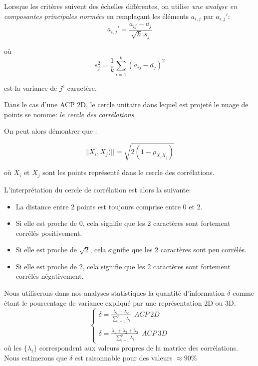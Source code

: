 \documentclass[a4paper]{article}
\begin{document}
Lorsque les critères suivent des échelles différentes, on utilise \textit{une analyse en composantes principales normées}  en remplaçant les éléments $a_{i,j}$ par $a_{i,j}'$:
$$a_{i,j}'=\frac{a_{ij}-\overline{a_{j}}}{\sqrt{k} .s_{j}}$$

où
$$s_{j}^{2}=\frac{1}{k}\sum_{i=1}^{k}(a_{ij}-\overline{a_{j}})^{2}$$

est la variance de $j^{e}$ caractère. 


Dans le cas d'une ACP 2D, le cercle unitaire dans lequel est projeté le nuage de points se nomme: \textit{le cercle des corrélations}.

On peut alors démontrer que :

$$||X_{i},X_{j})||=\sqrt{2(1-\rho_{X_{i}X_{j}})}$$

où $X_{i}$ et $X_{j}$ sont les points représenté dans le cercle des corrélations.



L'interprétation du cercle de corrélation est alors la suivante:

\begin{itemize}
  \item La distance entre 2 points est toujours comprise entre 0 et 2.
  \item Si elle est proche de 0, cela signifie que les 2 caractères sont fortement corrélés positivement.
   \item Si elle est proche de $\sqrt{2}$, cela signifie que les 2 caractères sont peu corrélés.
   \item Si elle est proche de 2, cela signifie que les 2 caractères sont fortement corrélés négativement.

\end{itemize}

Nous utiliserons dans nos analyses statistiques la quantité d'information $\delta$ comme étant le pourcentage de variance expliqué par une représentation 2D ou 3D.
\[
\left\lbrace 
\begin{array}{lcl}
\delta=\frac{\lambda_{1}+\lambda_{2}}{\sum_{i=1}^{p}\lambda_{i}} \ \ ACP \ 2D\\ \\

\delta=\frac{\lambda_{1}+\lambda_{2}+\lambda_{3}}{\sum_{i=1}^{p}\lambda_{i}} \ \ ACP \ 3D

\end{array}\right.
\]
où les $\{\lambda_{i}\}$ correspondent aux valeurs propres de la matrice des corrélations. Nous estimerons que $\delta$ est raisonnable pour des valeurs $\approx 90\%$ 
\end{document}
